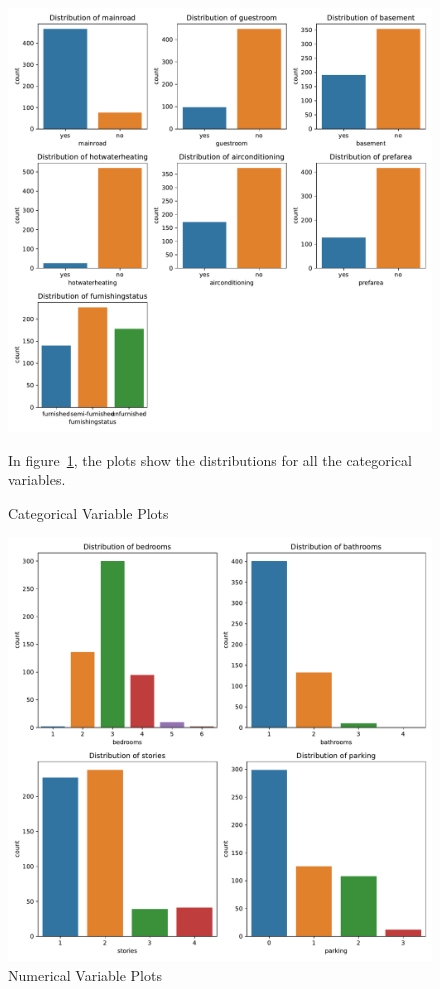 \documentclass[12pt]{article}
\begin{document}
\begin{figure}
    \includegraphics[width=1\textwidth]{categorical_plots.pdf}
    \caption{Categorical Variable Plots}
    \label{fig:categorical_plots}
In figure~\ref{fig:categorical_plots}, the plots show the distributions for all the categorical variables. 

\end{figure}



\begin{figure}

    \includegraphics[width=1\textwidth]{numerical_plots.pdf}
    \caption{Numerical Variable Plots}
    \label{fig:numberical_plots}
\end{figure}
\end{document}

